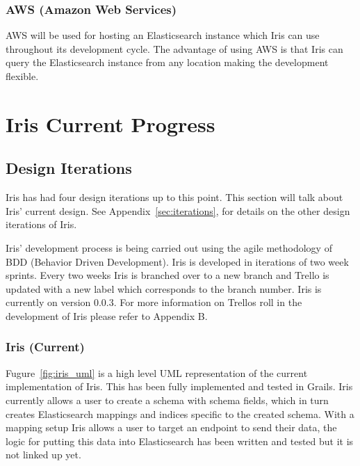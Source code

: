 \documentclass[12pt,a4paper,titlepage]{report}
\begin{document}
\subsection{AWS (Amazon Web Services)}

AWS will be used for hosting an Elasticsearch instance which Iris can use throughout its development cycle. The advantage of using AWS is that Iris can query the Elasticsearch instance from any location making the development flexible.

\chapter{Iris Current Progress}

\section{Design Iterations}

Iris has had four design iterations up to this point. This section will talk about Iris’ current design. See Appendix~\ref{sec:iterations}, for details on the other design iterations of Iris. 

Iris’ development process is being carried out using the agile methodology of BDD (Behavior Driven Development). Iris is developed in iterations of two week sprints. Every two weeks Iris is branched over to a new branch and Trello is updated with a new label which corresponds to the branch number. Iris is currently on version 0.0.3. For more information on Trellos roll in the development of Iris please refer to Appendix B.

\subsection{Iris (Current)}

Fugure~\ref{fig:iris_uml} is a high level UML representation of the current implementation of Iris. 
This has been fully implemented and tested in Grails. Iris currently allows a user to create a schema with schema fields, which in turn creates Elasticsearch mappings and indices specific to the created schema. With a mapping setup Iris allows a user to target an endpoint to send their data, the logic for putting this data into Elasticsearch has been written and tested but it is not linked up yet.
\end{document}
